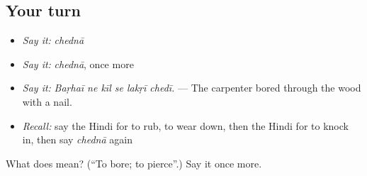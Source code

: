 \subsection*{Your turn}
\begin{itemize}
\raggedright
  \item \emph{Say it:} \emph{chednā}
  \item \emph{Say it:} \emph{chednā}, once more
  \item \emph{Say it:} \emph{Baṛhaī ne kīl se lakṛī chedī.} — The carpenter bored through the wood with a nail.
  \item \emph{Recall:} say the Hindi for to rub, to wear down, then the Hindi for to knock in, then say \emph{chednā} again
\end{itemize}

\begin{tcolorbox}[breakable,colback=teal!4,colframe=teal!35!black,title={Before you move on}]
What does  mean? (\textquotedblleft{}To bore; to pierce\textquotedblright{}.) Say it once more.
\end{tcolorbox}

